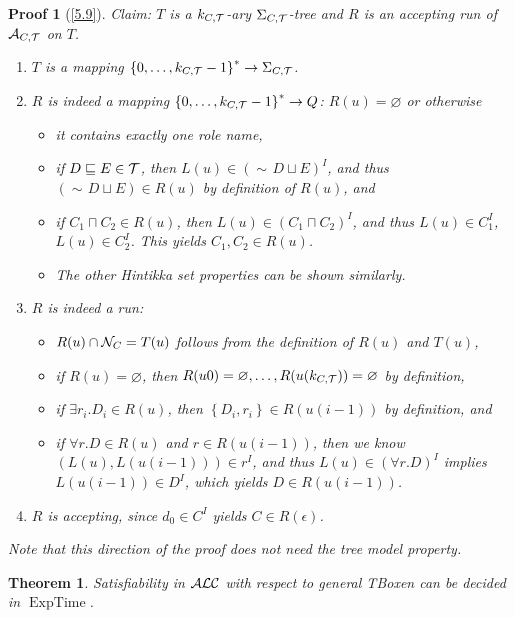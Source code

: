 \documentclass[openany]{scrbook}
\theoremstyle{break}
\newtheorem{Theorem}{Theorem}[chapter]
\theoremstyle{nonumberbreak}
\theoremstyle{nonumberplain}
\theoremstyle{nonumberbreak}
\newtheorem{Proof}{Proof}
\newcommand{\set}[1]{\left\{#1\right\}}
\newcommand{\ALC}{{\cal A}{\cal L}{\cal C}}
\newcommand{\nnf}{\mathop{\sim\!}}
\newcommand{\ExpTime}{\operatorname{ExpTime}}
\begin{document}
\begin{Proof}[\cref{5.9}]
  Claim: $T$ is a $k_{C, {\cal T}}$-ary $\Sigma_{C, {\cal T}}$-tree
  and $R$ is an accepting run of ${\cal A}_{C, {\cal T}}$ on $T$.
  \begin{enumerate}
  \item $T$ is a mapping $\set{0, \dotsc, k_{C, {\cal T}} - 1}^* \to
    \Sigma_{C, {\cal T}}$.
  \item $R$ is indeed a mapping $\set{0, \dotsc, k_{C, {\cal T}} -
      1}^* \to Q$: $R(u) = \varnothing$ or otherwise
    \begin{itemize}
    \item it contains exactly one role name,
    \item if $D \sqsubseteq E \in {\cal T}$, then $L(u) \in (\nnf D
      \sqcup E)^I$, and thus $(\nnf D \sqcup E) \in R(u)$ by
      definition of $R(u)$, and
    \item if $C_1 \sqcap C_2 \in R(u)$, then $L(u) \in (C_1 \sqcap
      C_2)^I$, and thus $L(u) \in C_1^I$, $L(u) \in C_2^I$. This
      yields $C_1, C_2 \in R(u)$.
    \item The other Hintikka set properties can be shown similarly.
    \end{itemize}
  \item $R$ is indeed a run:
    \begin{itemize}
    \item $R(u) \cap {\cal N}_C = T(u)$ follows from the definition of
      $R(u)$ and $T(u)$,
    \item if $R(u) = \varnothing$, then $R(u0) = \varnothing, \dotsc,
      R(u(k_{C, {\cal T}})) = \varnothing$ by definition,
    \item if $\exists r_i.D_i \in R(u)$, then $\set{D_i, r_i} \in
      R(u(i - 1))$ by definition, and
    \item if $\forall r.D \in R(u)$ and $r \in R(u(i - 1))$, then we
      know $(L(u), L(u(i - 1))) \in r^I$, and thus $L(u) \in (\forall
      r.D)^I$ implies $L(u(i - 1)) \in D^I$, which yields $D \in R(u(i
      - 1))$.
    \end{itemize}
  \item $R$ is accepting, since $d_0 \in C^I$ yields $C \in
    R(\epsilon)$.
  \end{enumerate}

  Note that this direction of the proof does not need the tree model
  property.
\end{Proof}

\begin{Theorem}
  \label{5.10}
  Satisfiability in $\ALC$ with respect to general TBoxen can be
  decided in $\ExpTime$.
\end{Theorem}
\end{document}
